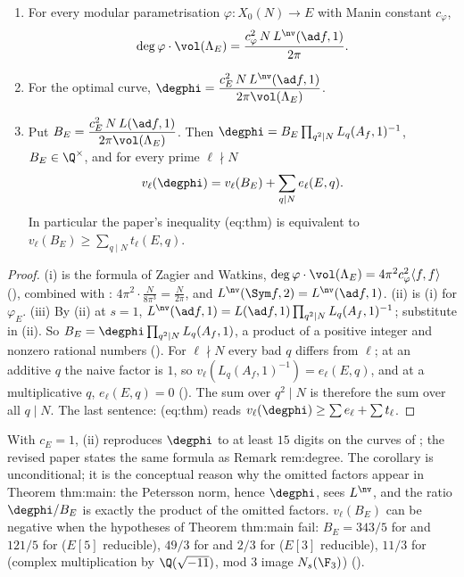 \begin{corollary}\label{cor:lfunctions:degree-formula}
\begin{enumerate}[label=(\roman*)]
\item For every modular parametrisation $\varphi\colon X_0(N)\to E$ with Manin constant $c_\varphi$,
\[
\deg\varphi\cdot\vol(\Lambda_E)=\frac{c_\varphi^2\,N\,L^{\nv}(\ad f,1)}{2\pi}.
\]
\item For the optimal curve, $\degphi=\dfrac{c_E^2\,N\,L^{\nv}(\ad f,1)}{2\pi\vol(\Lambda_E)}$.
\item Put $B_E=\dfrac{c_E^2\,N\,L(\ad f,1)}{2\pi\vol(\Lambda_E)}$. Then $\degphi=B_E\prod_{q^2\mid N}L_q(A_f,1)^{-1}$, $B_E\in\Q^\times$, and for every prime $\ell\nmid N$
\[
v_\ell(\degphi)=v_\ell(B_E)+\sum_{q\mid N}e_\ell(E,q).
\]
In particular the paper's inequality (eq:thm) is equivalent to $v_\ell(B_E)\ge\sum_{q\mid N}t_\ell(E,q)$.
\end{enumerate}
\end{corollary}

\begin{proof}
(i) is the formula of Zagier and Watkins, $\deg\varphi\cdot\vol(\Lambda_E)=4\pi^2c_\varphi^2\langle f,f\rangle$ (), combined with :
$4\pi^2\cdot\frac N{8\pi^3}=\frac N{2\pi}$, and $L^{\nv}(\Sym f,2)=L^{\nv}(\ad f,1)$. (ii) is (i) for $\varphi_E$. (iii) By (ii) at $s=1$,
$L^{\nv}(\ad f,1)=L(\ad f,1)\prod_{q^2\mid N}L_q(A_f,1)^{-1}$; substitute in (ii). So $B_E=\degphi\prod_{q^2\mid N}L_q(A_f,1)$, a product of a positive integer and nonzero rational
numbers (). For $\ell\nmid N$ every bad $q$ differs from $\ell$; at an additive $q$ the naive factor is $1$, so
$v_\ell(L_q(A_f,1)^{-1})=e_\ell(E,q)$, and at a multiplicative $q$, $e_\ell(E,q)=0$ (). The sum over $q^2\mid N$ is therefore the sum over all $q\mid N$.
The last sentence: (eq:thm) reads $v_\ell(\degphi)\ge\sum e_\ell+\sum t_\ell$.
\end{proof}

With $c_E=1$, (ii) reproduces $\degphi$ to at least $15$ digits on the curves of ; the revised paper states the
same formula as Remark rem:degree. The corollary is unconditional; it is the conceptual reason why the omitted factors appear in Theorem thm:main: the
Petersson norm, hence $\degphi$, sees $L^{\nv}$, and the ratio $\degphi/B_E$ is exactly the product of the omitted factors. $v_\ell(B_E)$ can be negative when the
hypotheses of Theorem thm:main fail: $B_E=343/5$ for  and $121/5$ for  ($E[5]$ reducible), $49/3$ for  and $2/3$ for 
($E[3]$ reducible), $11/3$ for  (complex multiplication by $\Q(\sqrt{-11})$, mod $3$ image $N_s(\F_3)$) ().

